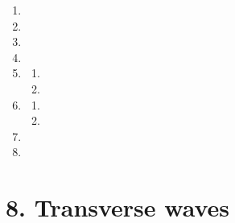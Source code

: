 \begin{enumerate}[itemsep=6pt, label=\textbf{\arabic*}. ]
\item %
 
\item %
\item %


\item %
\item %
\begin{enumerate}[noitemsep, label=\textbf{(\alph*)} ]
\item %
\item %
\end{enumerate} 
\item %
\begin{enumerate}[noitemsep, label=\textbf{(\alph*)} ] 
\item %
\item %
\end{enumerate} 
\item %
\item %

\end{enumerate}


\section {8. Transverse waves}
